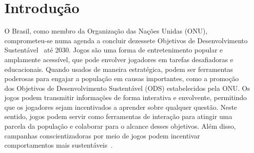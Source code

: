 \chapter{Introdução}

O Brasil, como membro da Organização das Nações Unidas (ONU), comprometeu-se numa agenda a concluir dezessete Objetivos de Desenvolvimento Sustentável~\cite{odsbrasil} até 2030. Jogos são uma forma de entretenimento popular e amplamente acessível, que pode envolver jogadores em tarefas desafiadoras e educacionais. Quando usados de maneira estratégica, podem ser ferramentas poderosas para engajar a população em causas importantes, como a promoção dos Objetivos de Desenvolvimento Sustentável (ODS) estabelecidos pela ONU. Os jogos podem transmitir informações de forma interativa e envolvente, permitindo que os jogadores sejam incentivados a aprender sobre qualquer questão. Neste sentido, jogos podem servir como ferramentas de interação para atingir uma parcela da população e colaborar para o alcance desses objetivos. Além disso, campanhas conscientizadoras por meio de jogos podem incentivar comportamentos mais sustentáveis~\cite{joseamericonetoGameOds}.

